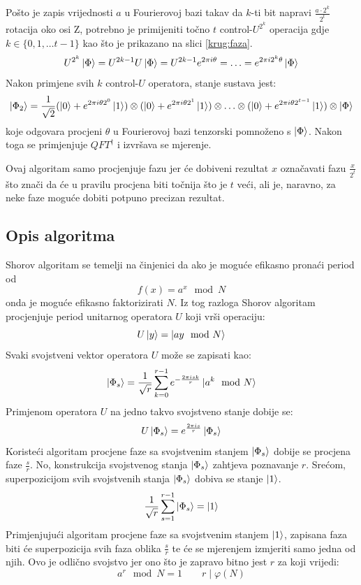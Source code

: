 Pošto je zapis vrijednosti $a$ u Fourierovoj bazi takav da $k$-ti bit napravi $\frac{a\cdot 2^k}{2^t}$ rotacija oko osi Z, potrebno je primijeniti točno $t$ control-$U^{2^k}$ operacija gdje $k \in \{0, 1,\ldots t - 1\}$ kao što je prikazano na slici \ref{krug:faza}.
\[
U^{2^k}\ket{\Phi} = U^{2k-1}U\ket{\Phi} = U^{2k-1}e^{2\pi i\theta} = \ldots = e^{2\pi i 2^k\theta}\ket{\Phi}
\]
Nakon primjene svih $k$ control-$U$ operatora, stanje sustava jest:
\[
\ket{\Phi_2} = \frac{1}{\sqrt{2}}
(\ket{0}+e^{2\pi i\theta 2^0}\ket{1})\otimes
(\ket{0}+e^{2\pi i\theta 2^1}\ket{1})\otimes
\ldots \otimes
(\ket{0}+e^{2\pi i\theta 2^{t-1}}\ket{1}) \otimes
\ket{\Phi}
\]
koje odgovara procjeni $\theta$ u Fourierovoj bazi tenzorski pomnoženo s $\ket{\Phi}$. Nakon toga se primjenjuje $QFT^{\dagger}$ i izvršava se mjerenje.

Ovaj algoritam samo procjenjuje fazu jer će dobiveni rezultat $x$ označavati fazu $\frac{x}{2^t}$ što znači da će u pravilu procjena biti točnija što je $t$ veći, ali je, naravno, za neke faze moguće dobiti potpuno precizan rezultat.

\subsection{Opis algoritma}

Shorov algoritam se temelji na činjenici da ako je moguće efikasno pronaći period od
\[
f(x) = a^x \mod N
\]
onda je moguće efikasno faktorizirati $N$. Iz tog razloga Shorov algoritam procjenjuje period unitarnog operatora $U$ koji vrši operaciju:
\[
U\ket{y} = \ket{ay\mod N}
\]
Svaki svojstveni vektor operatora $U$ može se zapisati kao:
\[
\ket{\Phi_s} = \frac{1}{\sqrt{r}}\sum_{k=0}^{r-1}e^{-\frac{2\pi i s k}{r}}\ket{a^k\mod N}
\]
Primjenom operatora $U$ na jedno takvo svojstveno stanje dobije se:
\[
U\ket{\Phi_s} = e^{\frac{2\pi i s}{r}}\ket{\Phi_s}
\]
Koristeći algoritam procjene faze sa svojstvenim stanjem $\ket{\Phi_s}$ dobije se procjena faze $\frac{s}{r}$. No, konstrukcija svojstvenog stanja $\ket{\Phi_s}$ zahtjeva poznavanje $r$. Srećom, superpozicijom svih svojstvenih stanja $\ket{\Phi_s}$ dobiva se stanje $\ket{1}$.
\[
\frac{1}{\sqrt{r}}\sum_{s=1}^{r-1}\ket{\Phi_s} = \ket{1}
\]
Primjenjujući algoritam procjene faze sa svojstvenim stanjem $\ket{1}$, zapisana faza biti će superpozicija svih faza oblika $\frac{s}{r}$ te će se mjerenjem izmjeriti samo jedna od njih. Ovo je odlično svojstvo jer ono što je zapravo bitno jest $r$ za koji vrijedi:
\[
a^r \mod N = 1 \qquad
r \mid \varphi(N)
\]

